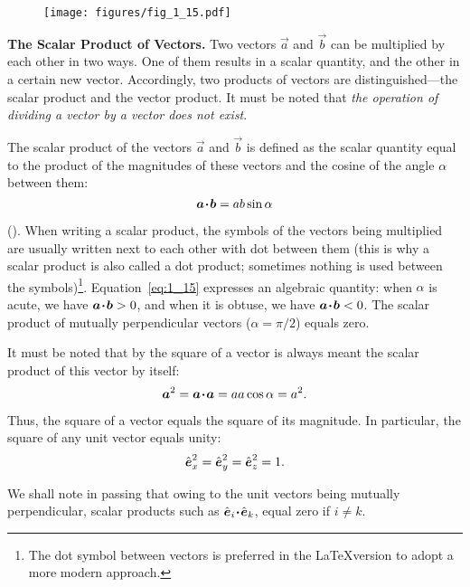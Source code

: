 \begin{figure}[t]
	\begin{center}
		\texttt{[image: figures/fig\_1\_15.pdf]}
		\caption[]{}
		\label{fig:1_15}
	\end{center}
	\vspace{-1.0cm}
\end{figure}

\textbf{The Scalar Product of Vectors.} Two vectors $\vec{a}$ and $\vec{b}$ can be multiplied by each other in two ways. One of them results in a scalar quantity, and the other in a certain new vector. Accordingly, two products of vectors are distinguished---the scalar product and the vector product. It must be noted that \textit{the operation of dividing a vector by a vector does not exist}.

The scalar product of the vectors $\vec{a}$ and $\vec{b}$ is defined as the scalar quantity equal to the product of the magnitudes of these vectors and the cosine of the angle $\alpha$ between them:
\begin{equation}\label{eq:1_15}
\boldsymbol{a\!\cdot\!b} = ab\sin\alpha
\end{equation}

\noindent
(). When writing a scalar product, the symbols of the vectors being multiplied are usually written next to each other with dot between them (this is why a scalar product is also called a dot product; sometimes nothing is used between the symbols)\footnote{The dot symbol between vectors is preferred in the \LaTeX version to adopt a more modern approach.}. Equation~\eqref{eq:1_15} expresses an algebraic quantity: when $\alpha$ is acute, we have $\boldsymbol{a\!\cdot\!b}>0$, and when it is obtuse, we have $\boldsymbol{a\!\cdot\!b}<0$. The scalar product of mutually perpendicular vectors ($\alpha=\pi/2$) equals zero.

It must be noted that by the square of a vector is always meant the scalar product of this vector by itself:
\begin{equation}\label{eq:1_16}
\boldsymbol{a}^2 = \boldsymbol{a\!\cdot\!a} = aa\cos\alpha = a^2.
\end{equation}

\noindent
Thus, the square of a vector equals the square of its magnitude. In particular, the square of any unit vector equals unity:
\begin{equation}\label{eq:1_17}
\hat{\boldsymbol{e}}_{x}^2 = \hat{\boldsymbol{e}}_{y}^2 = \hat{\boldsymbol{e}}_{z}^2 = 1.
\end{equation}

\noindent
We shall note in passing that owing to the unit vectors being mutually perpendicular, scalar products such as $\hat{\boldsymbol{e}}_{i}\!\boldsymbol{\cdot}\!\hat{\boldsymbol{e}}_{k}$, equal zero if $i\neq k$.

